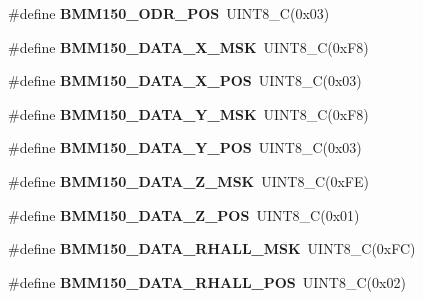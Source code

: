 \begin{DoxyCompactItemize}
\item 
\mbox{\label{group___b_m_m150_gaeac8b4bc79e2f9daac20ffd475a73e05}} 
\#define {\bfseries B\+M\+M150\+\_\+\+O\+D\+R\+\_\+\+P\+OS}~U\+I\+N\+T8\+\_\+C(0x03)
\item 
\mbox{\label{group___b_m_m150_ga952f91e7cac473b70e866b23aece8fbf}} 
\#define {\bfseries B\+M\+M150\+\_\+\+D\+A\+T\+A\+\_\+\+X\+\_\+\+M\+SK}~U\+I\+N\+T8\+\_\+C(0x\+F8)
\item 
\mbox{\label{group___b_m_m150_ga5adc2f4ea07bcedf8e77630b5edfa3cf}} 
\#define {\bfseries B\+M\+M150\+\_\+\+D\+A\+T\+A\+\_\+\+X\+\_\+\+P\+OS}~U\+I\+N\+T8\+\_\+C(0x03)
\item 
\mbox{\label{group___b_m_m150_gab32d9400291b2a4663f4b58a66e69987}} 
\#define {\bfseries B\+M\+M150\+\_\+\+D\+A\+T\+A\+\_\+\+Y\+\_\+\+M\+SK}~U\+I\+N\+T8\+\_\+C(0x\+F8)
\item 
\mbox{\label{group___b_m_m150_gaa592871f97a623ce6e2afe45303a2953}} 
\#define {\bfseries B\+M\+M150\+\_\+\+D\+A\+T\+A\+\_\+\+Y\+\_\+\+P\+OS}~U\+I\+N\+T8\+\_\+C(0x03)
\item 
\mbox{\label{group___b_m_m150_ga986d5cc7d9446cfe96bdb780abce74c7}} 
\#define {\bfseries B\+M\+M150\+\_\+\+D\+A\+T\+A\+\_\+\+Z\+\_\+\+M\+SK}~U\+I\+N\+T8\+\_\+C(0x\+F\+E)
\item 
\mbox{\label{group___b_m_m150_gabe646b483626271a96bcbd9d708e1dbb}} 
\#define {\bfseries B\+M\+M150\+\_\+\+D\+A\+T\+A\+\_\+\+Z\+\_\+\+P\+OS}~U\+I\+N\+T8\+\_\+C(0x01)
\item 
\mbox{\label{group___b_m_m150_gade03ff196c69db24827960ee95a1aecb}} 
\#define {\bfseries B\+M\+M150\+\_\+\+D\+A\+T\+A\+\_\+\+R\+H\+A\+L\+L\+\_\+\+M\+SK}~U\+I\+N\+T8\+\_\+C(0x\+F\+C)
\item 
\mbox{\label{group___b_m_m150_ga8e3d956394d8e5726469aec9389fd205}} 
\#define {\bfseries B\+M\+M150\+\_\+\+D\+A\+T\+A\+\_\+\+R\+H\+A\+L\+L\+\_\+\+P\+OS}~U\+I\+N\+T8\+\_\+C(0x02)
\item 
\mbox{\label{group___b_m_m150_gac8eb6d7fd78c6fbb64b1cd9ab6972797}} 

\end{DoxyCompactItemize}
